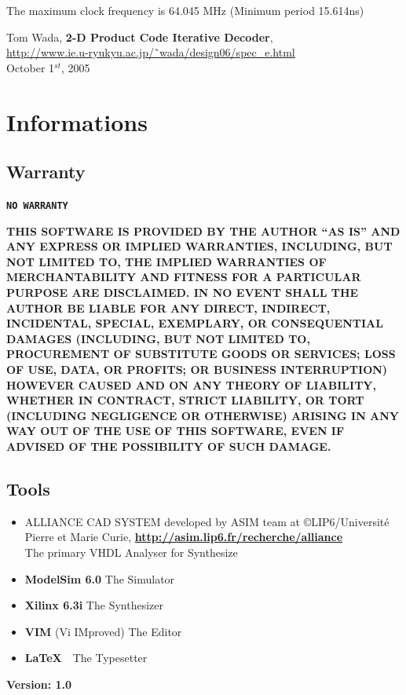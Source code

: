 \documentclass[a4paper,12pt]{report}
\begin{document}
The maximum clock frequency is 64.045 MHz (Minimum period 15.614ns)

\begin{thebibliography}{1}

Tom Wada, \textbf{2-D Product Code Iterative Decoder},\\
\href{http://www.ie.u-ryukyu.ac.jp/\~\ wada/design06/spec\_e.html}
     {http://www.ie.u-ryukyu.ac.jp/\~\ wada/design06/spec\_e.html}\\
     October 1$^{st}$, 2005

\end{thebibliography}

\appendix

\chapter{Informations}

\section{Warranty}

\begin{center}
\textbf{\texttt{NO WARRANTY}}\\
\end{center}

\textbf{\scriptsize{
THIS SOFTWARE IS PROVIDED BY THE AUTHOR ``AS IS'' AND ANY EXPRESS OR
IMPLIED WARRANTIES, INCLUDING, BUT NOT LIMITED TO, THE IMPLIED WARRANTIES
OF MERCHANTABILITY AND FITNESS FOR A PARTICULAR PURPOSE ARE DISCLAIMED.
IN NO EVENT SHALL THE AUTHOR BE LIABLE FOR ANY DIRECT, INDIRECT,
INCIDENTAL, SPECIAL, EXEMPLARY, OR CONSEQUENTIAL DAMAGES (INCLUDING, BUT
NOT LIMITED TO, PROCUREMENT OF SUBSTITUTE GOODS OR SERVICES; LOSS OF USE,
DATA, OR PROFITS; OR BUSINESS INTERRUPTION) HOWEVER CAUSED AND ON ANY
THEORY OF LIABILITY, WHETHER IN CONTRACT, STRICT LIABILITY, OR TORT
(INCLUDING NEGLIGENCE OR OTHERWISE) ARISING IN ANY WAY OUT OF THE USE OF
THIS SOFTWARE, EVEN IF ADVISED OF THE POSSIBILITY OF SUCH DAMAGE.}}

\section{Tools}

\begin{itemize}
\item ALLIANCE CAD SYSTEM developed by ASIM
      team at \copyright LIP6/Universit\'{e} Pierre et
      Marie Curie,
      \href{http://asim.lip6.fr/recherche/alliance}{\textbf{http://asim.lip6.fr/recherche/alliance}}\\
      The primary VHDL Analyser for Synthesize
\item \textbf{ModelSim 6.0} The Simulator
\item \textbf{Xilinx 6.3i} The Synthesizer
\item \textbf{VIM} (Vi IMproved) The Editor
\item \textbf{\LaTeX}~~The Typesetter
\end{itemize}

\vspace{15cm}
\begin{tabbing}
\textbf{Version: 1.0} 
\end{tabbing}
\end{document}
